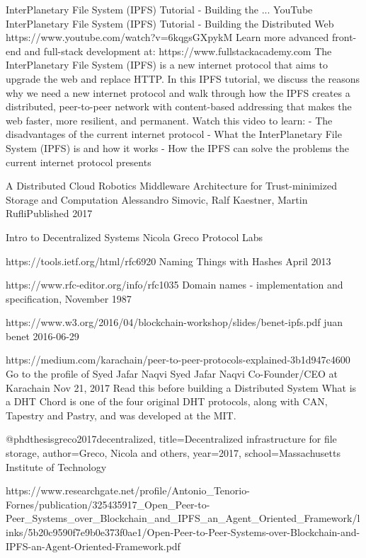 InterPlanetary File System (IPFS) Tutorial - Building the ...  YouTube
InterPlanetary File System (IPFS) Tutorial - Building the Distributed
Web https://www.youtube.com/watch?v=6kqgsGXpykM Learn more advanced
front-end and full-stack development at:
https://www.fullstackacademy.com The InterPlanetary File System (IPFS)
is a new internet protocol that aims to upgrade the web and replace
HTTP. In this IPFS tutorial, we discuss the reasons why we need a new
internet protocol and walk through how the IPFS creates a distributed,
peer-to-peer network with content-based addressing that makes the web
faster, more resilient, and permanent.  Watch this video to learn: -
The disadvantages of the current internet protocol - What the
InterPlanetary File System (IPFS) is and how it works - How the IPFS
can solve the problems the current internet protocol presents


A Distributed Cloud Robotics Middleware Architecture for Trust-minimized Storage and Computation
Alessandro Simovic, Ralf Kaestner, Martin RufliPublished 2017


Intro to
Decentralized Systems
Nicola Greco
Protocol Labs


https://tools.ietf.org/html/rfc6920 Naming Things with Hashes
April 2013

https://www.rfc-editor.org/info/rfc1035 Domain names - implementation
and specification, November 1987


https://www.w3.org/2016/04/blockchain-workshop/slides/benet-ipfs.pdf
juan benet
2016-06-29

https://medium.com/karachain/peer-to-peer-protocols-explained-3b1d947c4600
Go to the profile of Syed Jafar Naqvi Syed Jafar Naqvi Co-Founder/CEO
at Karachain Nov 21, 2017 Read this before building a Distributed
System What is a DHT Chord is one of the four original DHT protocols,
along with CAN, Tapestry and Pastry, and was developed at the MIT.

@phdthesis{greco2017decentralized,
  title={Decentralized infrastructure for file storage},
  author={Greco, Nicola and others},
  year={2017},
  school={Massachusetts Institute of Technology}
}

https://www.researchgate.net/profile/Antonio_Tenorio-Fornes/publication/325435917_Open_Peer-to-Peer_Systems_over_Blockchain_and_IPFS_an_Agent_Oriented_Framework/links/5b20c9590f7e9b0e373f0ae1/Open-Peer-to-Peer-Systems-over-Blockchain-and-IPFS-an-Agent-Oriented-Framework.pdf
